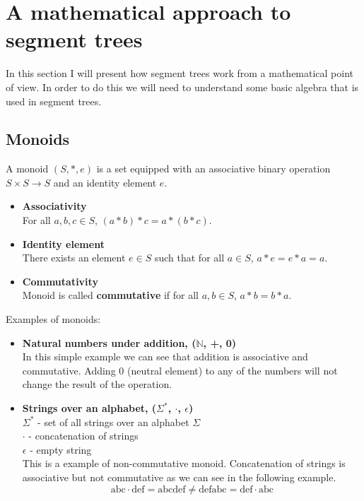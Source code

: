 \documentclass[11pt]{article}
\begin{document}
\vspace{1em}


\section{A mathematical approach to segment trees}
In this section I will present how segment trees work from a mathematical point of view.
In order to do this we will need to understand some basic algebra that is used in segment trees.


\subsection{Monoids}
A monoid \( (S, \ast, e) \) is a set equipped with an associative binary operation \( S \times S \to S \) and
an identity element \(e\). 
\begin{itemize}
    \item \textbf{Associativity} \\
    For all \( a, b, c \in S \), \( (a \ast b) \ast c = a \ast (b \ast c) \).
    \item \textbf{Identity element} \\
    There exists an element \( e \in S \) such that for all \( a \in S \), \( a \ast e = e \ast a = a \).
    \item \textbf{Commutativity} \\
    Monoid is called \textbf{commutative} if for all \( a, b \in S \), \( a \ast b = b \ast a \).
\end{itemize}
Examples of monoids:
\begin{itemize}
    \item \textbf{Natural numbers under addition, (\(\mathbb{N}\), +, 0) } \\
    In this simple example we can see that addition is associative and commutative. 
    Adding 0 (neutral element) to any of the numbers will not change the result of the operation.
    \item \textbf{Strings over an alphabet, (\(\Sigma^*\), \(\cdot\), \(\epsilon\))} \\
    \(\Sigma^*\) - set of all strings over an alphabet \(\Sigma\) \\
    \(\cdot\) - concatenation of strings \\
    \(\epsilon\) - empty string \\
    This is a example of non-commutative monoid. Concatenation of strings is associative but not commutative as we can see in the following example.
    \begin{equation}
        \text{abc} \cdot \text{def} = \text{abcdef} \neq \text{defabc} = \text{def} \cdot \text{abc}
    \end{equation}
\end{itemize}
\end{document}
